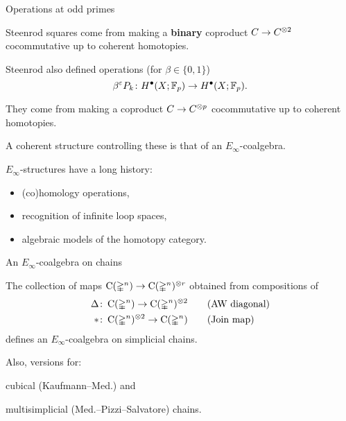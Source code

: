 
\begin{frame}{Operations at odd primes}

	\pause

	Steenrod squares come from making a \textbf{binary} coproduct $C \to C^{\otimes 2}$ cocommutative up to coherent homotopies.

	\medskip\pause

	Steenrod also defined operations (for $\beta \in \{0,1\}$)
	\[
	\beta^{\varepsilon} P_k \colon H^\bullet(X; {\mathbb{F}_p}) \to H^\bullet(X; {\mathbb{F}_p}).
	\]

	\pause

	They come from making a coproduct $C \to C^{\otimes p}$ cocommutative up to coherent homotopies.

	\medskip\pause

	A coherent structure controlling these is that of an $E_\infty$-coalgebra.

	\medskip\pause

	$E_\infty$-structures have a long history:
	\begin{itemize}
		\item (co)homology operations,
		\item recognition of infinite loop spaces,
		\item algebraic models of the homotopy category.
	\end{itemize}
\end{frame}

\begin{frame}{An $E_\infty$-coalgebra on chains} \pause
	\begin{theorem}[Med.]
		The collection of maps $\operatorname{C}(\mathbb{\Delta}^n) \to \operatorname{C}(\mathbb{\Delta}^n)^{\otimes r}$ obtained from compositions of
		\begin{align*}
			\Delta &\colon \operatorname{C}(\mathbb{\Delta}^n) \to \operatorname{C}(\mathbb{\Delta}^n)^{\otimes 2}
			\qquad \text{(AW diagonal)} \\
			\ast &\colon \operatorname{C}(\mathbb{\Delta}^n)^{\otimes 2} \to \operatorname{C}(\mathbb{\Delta}^n)
			\qquad \text{(Join map)}
		\end{align*}
		defines an $E_\infty$-coalgebra on simplicial chains.
	\end{theorem}

	\pause

	\qquad \qquad \scalebox{0.7}{}

	\medskip\pause

	Also, versions for: \par
		\qquad \textcolor{pblue}{cubical} (Kaufmann--Med.) and \par
		\qquad \textcolor{pblue}{multisimplicial} (Med.--Pizzi--Salvatore) chains.
\end{frame}

